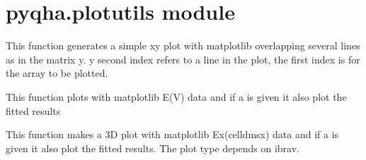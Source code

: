 \documentclass[letterpaper,10pt,english]{sphinxmanual}
\begin{document}

\begin{fulllineitems}
\label{pyqha:pyqha.minutils.fquartic}
\end{fulllineitems}


\begin{fulllineitems}
\label{pyqha:pyqha.minutils.fquartic_der}
\end{fulllineitems}



\section{pyqha.plotutils module}
\label{pyqha:module-pyqha.plotutils}\label{pyqha:pyqha-plotutils-module}

\begin{fulllineitems}
\label{pyqha:pyqha.plotutils.multiple_plot_xy}
This function generates a simple xy plot with matplotlib overlapping several
lines as in the matrix y. y second index refers to a line in the plot, the first 
index is for the array to be plotted.

\end{fulllineitems}


\begin{fulllineitems}
\label{pyqha:pyqha.plotutils.plot_EV}
This function plots with matplotlib E(V) data and if a is given it also plot
the fitted results

\end{fulllineitems}


\begin{fulllineitems}
\label{pyqha:pyqha.plotutils.plot_Etot}
This function makes a 3D plot with matplotlib Ex(celldmsx) data and if a is given it also plot
the fitted results. The plot type depends on ibrav.

\end{fulllineitems}
\end{document}
